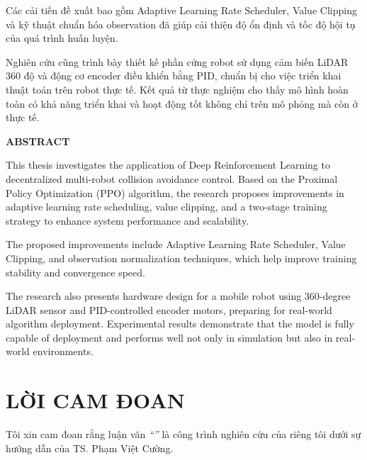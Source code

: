 Các cải tiến đề xuất bao gồm Adaptive Learning Rate Scheduler, Value Clipping và kỹ thuật chuẩn hóa observation đã giúp cải thiện độ ổn định và tốc độ hội tụ của quá trình huấn luyện.

Nghiên cứu cũng trình bày thiết kế phần cứng robot sử dụng cảm biến LiDAR 360 độ và động cơ encoder điều khiển bằng PID, chuẩn bị cho việc triển khai thuật toán trên robot thực tế. Kết quả từ thực nghiệm cho thấy mô hình hoàn toàn có khả năng triển khai và hoạt động tốt không chỉ trên mô phỏng mà còn ở thực tế.

\vspace{1.5cm}

\begin{center}
{\fontsize{14}{16}\selectfont\bfseries ABSTRACT}
\end{center}

\vspace{0.5cm}

This thesis investigates the application of Deep Reinforcement Learning to decentralized multi-robot collision avoidance control. Based on the Proximal Policy Optimization (PPO) algorithm, the research proposes improvements in adaptive learning rate scheduling, value clipping, and a two-stage training strategy to enhance system performance and scalability.

The proposed improvements include Adaptive Learning Rate Scheduler, Value Clipping, and observation normalization techniques, which help improve training stability and convergence speed.

The research also presents hardware design for a mobile robot using 360-degree LiDAR sensor and PID-controlled encoder motors, preparing for real-world algorithm deployment. Experimental results demonstrate that the model is fully capable of deployment and performs well not only in simulation but also in real-world environments.

\clearpage


\chapter*{LỜI CAM ĐOAN}

Tôi xin cam đoan rằng luận văn \textit{``\thesistitleVN''} là công trình nghiên cứu của riêng tôi dưới sự hướng dẫn của TS. Phạm Việt Cường.

